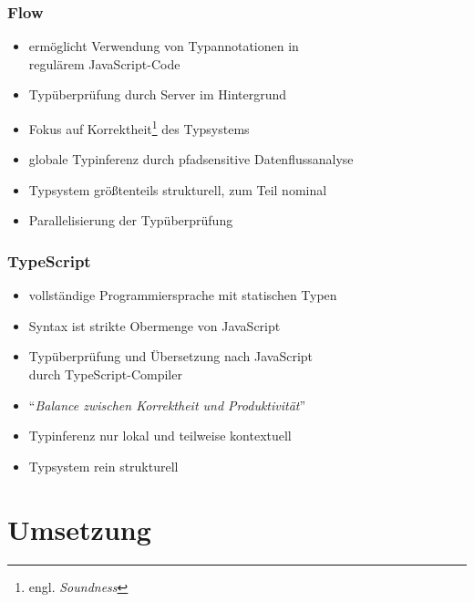     \begin{frame}
      \frametitle{Flow}
      \begin{itemize}
        \item ermöglicht Verwendung von Typannotationen in\\ regulärem JavaScript-Code
        \item Typüberprüfung durch Server im Hintergrund
        \item Fokus auf Korrektheit\footnote{engl. \textit{Soundness}} des Typsystems
        \item globale Typinferenz durch pfadsensitive Datenflussanalyse
        \item Typsystem größtenteils strukturell, zum Teil nominal
        \item Parallelisierung der Typüberprüfung
      \end{itemize}
    \end{frame}

    \begin{frame}
      \frametitle{TypeScript}
      \begin{itemize}
        \item vollständige Programmiersprache mit statischen Typen
        \item Syntax ist strikte Obermenge von JavaScript
        \item Typüberprüfung und Übersetzung nach JavaScript\\durch TypeScript-Compiler
        \item \enquote{\textit{Balance zwischen Korrektheit und Produktivität}}~\autocite{TYPESCRIPT:DESIGN_GOALS}
        \item Typinferenz nur lokal und teilweise kontextuell
        \item Typsystem rein strukturell
      \end{itemize}
    \end{frame}

  \section{Umsetzung}

